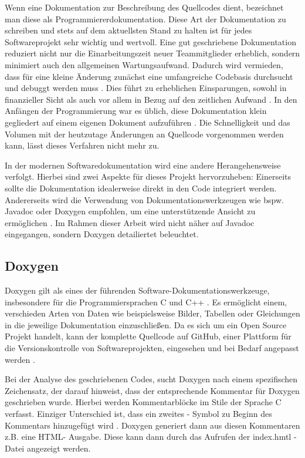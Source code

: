 \documentclass[11pt,a4paper]{report}
\begin{document}
\newpage
{}
\noindent
Wenn eine Dokumentation zur Beschreibung des Quellcodes dient, bezeichnet man diese als Programmiererdokumentation. Diese Art der Dokumentation zu schreiben und stets auf dem aktuellsten Stand zu halten ist für jedes Softwareprojekt sehr wichtig und wertvoll. Eine gut geschriebene Dokumentation reduziert nicht nur die Einarbeitungszeit neuer Teammitglieder erheblich, sondern minimiert auch den allgemeinen Wartungsaufwand. Dadurch wird vermieden, dass für eine kleine Änderung zunächst eine umfangreiche Codebasis durchsucht und debuggt werden muss \cite{Beningo}. Dies führt zu erheblichen Einsparungen, sowohl in finanzieller Sicht als auch vor allem in Bezug auf den zeitlichen Aufwand \cite{Lehner}. In den Anfängen der Programmierung war es üblich, diese Dokumentation klein gegliedert auf einem eigenen Dokument aufzuführen \cite{Lehner}. Die Schnelligkeit und das Volumen mit der heutzutage Änderungen an Quellcode vorgenommen werden kann, lässt dieses Verfahren nicht mehr zu.

\noindent
In der modernen Softwaredokumentation wird eine andere Herangehensweise verfolgt. Hierbei sind zwei Aspekte für dieses Projekt hervorzuheben: Einerseits sollte die Dokumentation idealerweise direkt in den Code integriert werden. Andererseits wird die Verwendung von Dokumentationswerkzeugen wie bspw. Javadoc oder Doxygen empfohlen, um eine unterstützende Ansicht zu ermöglichen \cite{Lehner}. Im Rahmen dieser Arbeit wird nicht näher auf Javadoc eingegangen, sondern Doxygen detailiertet beleuchtet. 

\subsection{Doxygen} \label{sub:Doxygen}

Doxygen gilt als eines der führenden Software-Dokumentationswerkzeuge, insbesondere für die Programmiersprachen C und C++ \cite{Beningo}. Es ermöglicht einem, verschieden Arten von Daten wie beispielsweise Bilder, Tabellen oder Gleichungen in die jeweilige Dokumentation einzuschließen. Da es sich um ein Open Source Projekt handelt, kann der komplette Quellcode auf GitHub, einer Plattform für die Versionskontrolle von Softwareprojekten, eingesehen und bei Bedarf angepasst werden \cite{doxygen_git}.

\noindent
Bei der Analyse des geschriebenen Codes, sucht Doxygen nach einem spezifischen Zeichensatz, der darauf hinweist, dass der entsprechende Kommentar für Doxygen geschrieben wurde. Hierbei werden Kommentarblöcke im Stile der Sprache C verfasst. Einziger Unterschied ist, dass ein zweites \glqq  *  \grqq{}- Symbol zu Beginn des Kommentars hinzugefügt wird \cite{Beningo}. Doxygen generiert dann aus diesen Kommentaren z.B. eine HTML- Ausgabe. Diese kann dann durch das Aufrufen der \glqq index.hmtl \grqq{}- Datei angezeigt werden.
\end{document}
